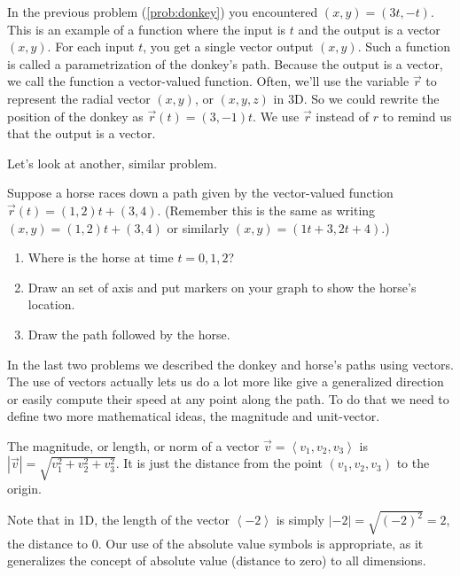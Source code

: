 \vskip0.2in

In the previous problem (\ref{prob:donkey}) you encountered $(x,y)=(3t,-t)$.  This is an example of a function where the input is $t$ and the output is a vector $(x,y)$.  For each input $t$, you get a single vector output $(x,y)$. Such a function is called a parametrization of the donkey's path. Because the output is a vector, we call the function a vector-valued function. Often, we'll use the variable $\vec r$ to represent the radial vector $(x,y)$, or $(x,y,z)$ in 3D.  So we could rewrite the position of the donkey as $\vec r(t)=(3,-1)t$. We use $\vec r$ instead of $r$ to remind us that the output is a vector.

Let's look at another, similar problem.

\begin{problem}\label{prob:horseline}
Suppose a horse races down a path given by the vector-valued function $\vec r(t) = (1,2)t+(3,4)$. (Remember this is the same as writing $(x,y) =  (1,2)t+(3,4)$ or similarly  $(x,y)=(1t+3,2t+4)$.)
\begin{enumerate}
	\item Where is the horse at time $t=0,1,2$? 
	\item Draw an set of axis and put markers on your graph to show the horse's location.
	\item Draw the path followed by the horse.
\end{enumerate}

\end{problem}



In the last two problems we described the donkey and horse's paths using vectors. The use of vectors actually lets us do a lot more like give a generalized direction or easily compute their speed at any point along the path. To do that we need to define two more mathematical ideas, the magnitude and unit-vector.

\begin{definition}
The magnitude, or length, or norm of a vector $\vec v = \left<v_1,v_2,v_3\right>$ is $|\vec v| = \sqrt{v_1^2+v_2^2+v_3^2}$. It is just the distance from the point $(v_1,v_2,v_3)$ to the origin.

Note that in 1D, the length of the vector $\left<-2\right>$ is simply $|-2|=\sqrt{(-2)^2}=2$, the distance to 0. Our use of the absolute value symbols is appropriate, as it generalizes the concept of absolute value (distance to zero) to all dimensions.

\end{definition}

